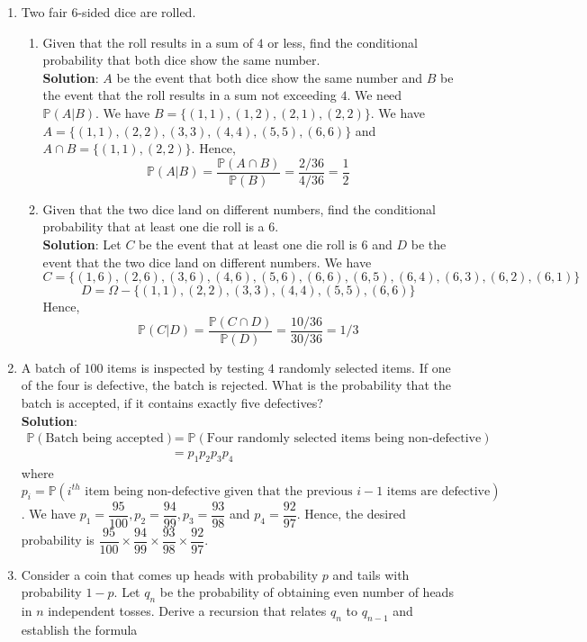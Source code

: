 \documentclass{article}
\newcommand{\dcap}{\displaystyle\cap}
\newcommand{\Pb}{\mathbb{P}}
\newcommand{\bkt}[1]{\left(#1\right)}
\newcommand{\soln}[1]{\textbf{Solution}: #1}
\begin{document}
\begin{enumerate}
		\item
		Two fair $6$-sided dice are rolled.
		\begin{enumerate}
			\item
			Given that the roll results in a sum of $4$ or less, find the conditional probability that both dice show the same number.\\
			\soln{$A$ be the event that both dice show the same number and $B$ be the event that the roll results in a sum not exceeding $4$. We need $\Pb \bkt{A \vert B}$. We have $B = \{(1,1),(1,2),(2,1),(2,2)\}$. We have $A = \{(1,1),(2,2),(3,3),(4,4),(5,5),(6,6)\}$ and $A \dcap B = \{(1,1),(2,2)\}$. Hence,
			$$\Pb\bkt{A \vert B} = \dfrac{\Pb \bkt{A \dcap B}}{\Pb\bkt{B}} = \dfrac{2/36}{4/36} = \dfrac12$$}
			\item
			Given that the two dice land on different numbers, find the conditional probability that at least one die roll is a $6$.\\
			\soln{Let $C$ be the event that at least one die roll is $6$ and $D$ be the event that the two dice land on different numbers. We have
			$$C = \{(1,6),(2,6),(3,6),(4,6),(5,6),(6,6),(6,5),(6,4),(6,3),(6,2),(6,1)\}$$
			$$D = \Omega-\{(1,1),(2,2),(3,3),(4,4),(5,5),(6,6)\}$$
			Hence,
			$$\Pb \bkt{C \vert D} = \dfrac{\Pb \bkt{C \dcap D}}{\Pb\bkt{D}} = \dfrac{10/36}{30/36} = 1/3$$
			}
		\end{enumerate}
		\item
		A batch of $100$ items is inspected by testing $4$ randomly selected items. If one of the four is defective, the batch is rejected. What is the probability that the batch is accepted, if it contains exactly five defectives?\\
		\soln{
		\begin{align}
			\Pb\bkt{\text{Batch being accepted}} & = \Pb\bkt{\text{Four randomly selected items being non-defective}}\\
			& = p_1 p_2 p_3 p_4
		\end{align}
		where $p_i = \Pb \bkt{i^{th} \text{ item being non-defective given that the previous }i-1 \text{ items are defective}}$. We have $p_1= \dfrac{95}{100}, p_2 = \dfrac{94}{99}, p_3 = \dfrac{93}{98}$ and $p_4 = \dfrac{92}{97}$. Hence, the desired probability is $\dfrac{95}{100} \times \dfrac{94}{99} \times \dfrac{93}{98} \times \dfrac{92}{97}$.
		}
		\item
		Consider a coin that comes up heads with probability $p$ and tails with probability $1-p$. Let $q_n$ be the probability of obtaining even number of heads in $n$ independent tosses. Derive a recursion that relates $q_n$ to $q_{n-1}$ and establish the formula

\end{enumerate}
\end{document}
